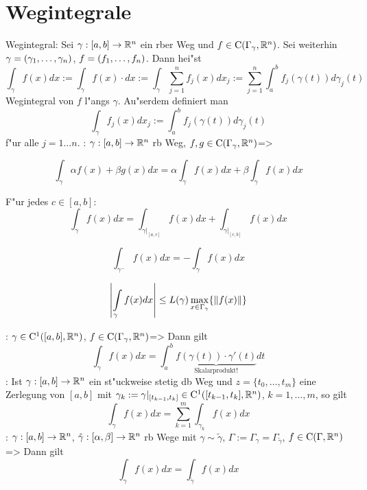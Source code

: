 \section{Wegintegrale}
 Wegintegral:{
  Sei $\gamma:[a,b]\to\mathbb R^n$ ein rber Weg und 
  $f\in{\rm C}(\Gamma_\gamma,\mathbb R^n)$. Sei weiterhin
  $\gamma=(\gamma_1,\ldots,\gamma_n)$, $f=(f_1,\ldots,f_n)$. Dann hei"st
  \[\int_\gamma f(x)dx:=\int_\gamma f(x)\cdot dx:=
    \int_\gamma \sum_{j=1}^n f_j(x)dx_j:=
    \sum_{j=1}^n \int_a^b f_j(\gamma(t)) d\gamma_j(t)
    \]
  Wegintegral von $f$ l"angs $\gamma$. Au"serdem definiert man
  \[\int_\gamma f_j(x)dx_j:=\int_a^b f_j(\gamma(t)) d\gamma_j(t)
    \]
  f"ur alle $j=1\ldots n$.
  }
\theorem:
  $\gamma:[a,b]\to\mathbb R^n$ rb Weg, $f,g\in{\rm C}(\Gamma_\gamma,\mathbb R^n)$=>{
  \begin{stmts}
    \item \[ \int_\gamma \alpha f(x)+\beta g(x) dx = 
      \alpha \int_\gamma f(x) dx+\beta \int_\gamma f(x) dx \]
    \item F"ur jedes $c\in[a,b]$: \[ \int_\gamma f(x) dx=
      \int_{\gamma|_{[a,c]}} f(x) dx+\int_{\gamma|_{[c,b]}} f(x) dx \]
    \item \[ \int_{\gamma^-} f(x) dx=-\int_\gamma f(x) dx \]
    \item \[ \left|\int_\gamma f(x) dx\right| \leq
      L(\gamma) \max_{x\in\Gamma_\gamma} \{\norm{f(x)} \}\]
    \end{stmts}
  }
\theorem:
  $\gamma\in{\rm C}^1([a,b],\mathbb R^n)$, $f\in{\rm C}(\Gamma_\gamma,\mathbb R^n)$=>{
  Dann gilt
  \[\int_\gamma f(x)dx=
    \int_a^b \underbrace{f(\gamma(t))\cdot\gamma'(t)}_{\text{Skalarprodukt!}} dt
    \]
  }
\remark:{
  Ist $\gamma:[a,b]\to\mathbb R^n$ ein st"uckweise stetig db Weg und
  $z=\{t_0,\ldots,t_m\}$ eine Zerlegung von $[a,b]$ mit 
  $\gamma_k:=\gamma|_{[t_{k-1},t_k]}\in{\rm C}^1([t_{k-1},t_k],\mathbb R^n)$, 
  $k=1,\ldots,m$, so gilt
  \[\int_\gamma f(x)dx=\sum_{k=1}^m \int_{\gamma_k} f(x)dx
    \]
  }
\theorem:
  $\gamma:[a,b]\to\mathbb R^n$, $\tilde\gamma:[\alpha,\beta]\to\mathbb R^n$
  rb Wege mit $\gamma\sim\tilde\gamma$, 
  $\Gamma:=\Gamma_\gamma=\Gamma_{\tilde\gamma}$,
  $f\in{\rm C}(\Gamma,\mathbb R^n)$=>{
  Dann gilt
  \[\int_\gamma f(x)dx=\int_{\tilde\gamma} f(x)dx
    \]
  }
